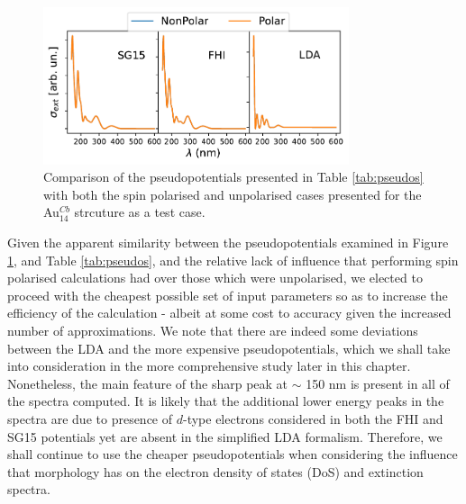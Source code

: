 \begin{figure}
    \centering
    \includegraphics[width=0.8\textwidth]{figures/LM/Atomistic/PPs_Compare.pdf}
    \caption{Comparison of the pseudopotentials presented in Table \ref{tab:pseudos} with both the spin polarised and unpolarised cases presented for the Au$_{14}^{Cb}$ strcuture as a test case.}
    \label{fig:pps}
\end{figure}

Given the apparent similarity between the pseudopotentials examined in Figure \ref{fig:pps}, and Table \ref{tab:pseudos}, and the relative lack of influence that performing spin polarised calculations had over those which were unpolarised, we elected to proceed with the cheapest possible set of input parameters so as to increase the efficiency of the calculation - albeit at some cost to accuracy given the increased number of approximations. We note that there are indeed some deviations between the LDA and the more expensive pseudopotentials, which we shall take into consideration in the more comprehensive study later in this chapter. Nonetheless, the main feature of the sharp peak at $\sim$ 150 nm is present in all of the spectra computed. It is likely that the additional lower energy peaks in the spectra are due to presence of $d$-type electrons considered in both the FHI and SG15 potentials yet are absent in the simplified LDA formalism. Therefore, we shall continue to use the cheaper pseudopotentials when considering the influence that morphology has on the electron density of states (DoS) and extinction spectra. 


